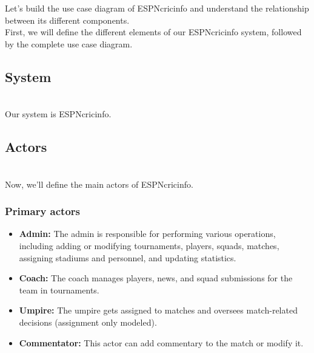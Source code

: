 

Let's build the use case diagram of ESPNcricinfo and understand the relationship between its different components.
\\
First, we will define the different elements of our ESPNcricinfo system, followed by the complete use case diagram.

\subsection{System}\label{TwFe58jJlqaiOugJM-2Z_}
\\
Our system is ESPNcricinfo.

\subsection{Actors}\label{8l7R0YYWNfCVk8NNXlXJZ}
\\
Now, we'll define the main actors of ESPNcricinfo.

\subsubsection{Primary actors}\label{seb9p4ykuEsfu7Ln7DBaM}

\begin{itemize}
\item
\protect{}\label{2usCBW6OB2oa7YUQWla_7}
\textbf{Admin:} The admin is responsible for performing various operations, including adding or modifying tournaments, players, squads, matches, assigning stadiums and personnel, and updating statistics.
\item
\protect{}\label{eoRcwcssMNQB7dohPpfKK}
\textbf{Coach:} The coach manages players, news, and squad submissions for the team in tournaments.
\item
\protect{}\label{5TE4fHHlROCEv7Gsyscov}
\textbf{Umpire:} The umpire gets assigned to matches and oversees match-related decisions (assignment only modeled).
\item
\protect{}\label{dJQ494rM2pfLt3s9TUIjL}
\textbf{Commentator:} This actor can add commentary to the match or modify it.
\end{itemize}

